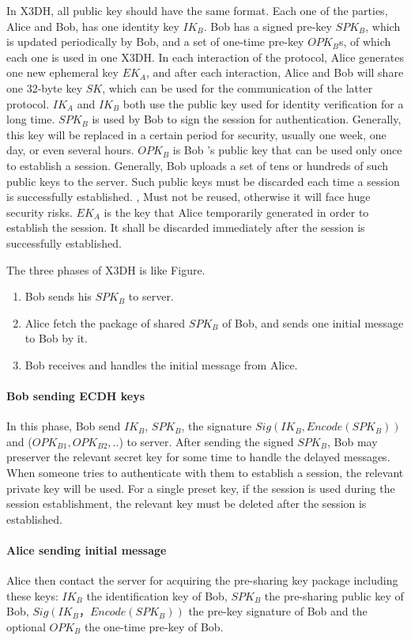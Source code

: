 \documentclass[11pt,en]{elegantpaper}
\begin{document}
In X3DH, all public key should have the same format. Each one of the parties, Alice and Bob, has one identity key $IK_B$. Bob has a signed pre-key $SPK_B$, which is updated periodically by Bob, and a set of one-time pre-key $OPK_B$s, of which each one is used in one X3DH. In each interaction of the protocol, Alice generates one new ephemeral key $EK_A$, and after each interaction, Alice and Bob will share one 32-byte key $SK$, which can be used for the communication of the latter protocol. $IK_A$ and $IK_B$ both use the public key used for identity verification for a long time. $SPK_B$ is used by Bob to sign the session for authentication. Generally, this key will be replaced in a certain period for security, usually one week, one day, or even several hours. $OPK_B$ is Bob ’s public key that can be used only once to establish a session. Generally, Bob uploads a set of tens or hundreds of such public keys to the server. Such public keys must be discarded each time a session is successfully established. , Must not be reused, otherwise it will face huge security risks. $EK_A$ is the key that Alice temporarily generated in order to establish the session. It shall be discarded immediately after the session is successfully established.

The three phases of X3DH is like Figure.

\begin{enumerate}
    \item Bob sends his $SPK_B$ to server.
    \item Alice fetch the package of shared $SPK_B$ of Bob, and sends one initial message to Bob by it.
    \item Bob receives and handles the initial message from Alice.
\end{enumerate}

\paragraph{Bob sending ECDH keys}
In this phase, Bob send $IK_B$, $SPK_B$, the signature $Sig(IK_B, Encode(SPK_B))$ and ($OPK_{B1}, OPK_{B2},..$) to server. After sending the signed $SPK_B$, Bob may preserver the relevant secret key for some time to handle the delayed messages. When someone tries to authenticate with them to establish a session, the relevant private key will be used. For a single preset key, if the session is used during the session establishment, the relevant key must be deleted after the session is established.

\paragraph{Alice sending initial message}
Alice then contact the server for acquiring the pre-sharing key package including these keys: $IK_B$ the identification key of Bob, $SPK_B$ the pre-sharing public key of Bob, $Sig(IK_B，Encode(SPK_B))$ the pre-key signature of Bob and the optional $OPK_B$ the one-time pre-key of Bob.
\end{document}
